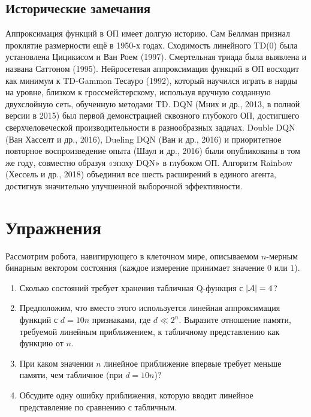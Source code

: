 \subsection{Исторические замечания}

Аппроксимация функций в ОП имеет долгую историю.  Сам Беллман признал проклятие размерности ещё в 1950-х годах.  Сходимость линейного TD(0) была установлена Цицикисом и Ван Роем (1997).  Смертельная триада была выявлена и названа Саттоном (1995).  Нейросетевая аппроксимация функций в ОП восходит как минимум к TD-Gammon Тесауро (1992), который научился играть в нарды на уровне, близком к гроссмейстерскому, используя вручную созданную двухслойную сеть, обученную методами TD.  DQN (Мних и др., 2013, в полной версии в 2015) был первой демонстрацией сквозного глубокого ОП, достигшего сверхчеловеческой производительности в разнообразных задачах.  Double DQN (Ван Хасселт и др., 2016), Dueling DQN (Ван и др., 2016) и приоритетное повторное воспроизведение опыта (Шаул и др., 2016) были опубликованы в том же году, совместно образуя «эпоху DQN» в глубоком ОП.  Алгоритм Rainbow (Хессель и др., 2018) объединил все шесть расширений в единого агента, достигнув значительно улучшенной выборочной эффективности.

\section*{Упражнения}
\label{sec:exercises-vfa}

\begin{exercise}
\label{ex:curse-dimensionality}
Рассмотрим робота, навигирующего в клеточном мире, описываемом $n$-мерным бинарным вектором состояния (каждое измерение принимает значение $0$ или $1$).
\begin{enumerate}
\item Сколько состояний требует хранения табличная Q-функция с $|\mathcal{A}| = 4$?
\item Предположим, что вместо этого используется линейная аппроксимация функций с $d = 10n$ признаками, где $d \ll 2^n$. Выразите отношение памяти, требуемой линейным приближением, к табличному представлению как функцию от $n$.
\item При каком значении $n$ линейное приближение впервые требует меньше памяти, чем табличное (при $d = 10n$)?
\item Обсудите одну ошибку приближения, которую вводит линейное представление по сравнению с табличным.
\end{enumerate}
\end{exercise}

